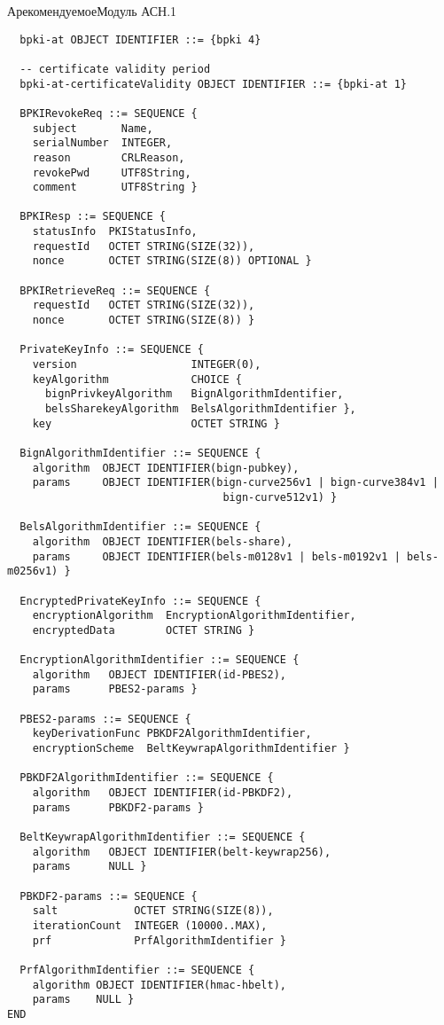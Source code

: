 \begin{appendix}{А}{рекомендуемое}{Модуль АСН.1}
\begin{verbatim}
  bpki-at OBJECT IDENTIFIER ::= {bpki 4}

  -- certificate validity period
  bpki-at-certificateValidity OBJECT IDENTIFIER ::= {bpki-at 1}

  BPKIRevokeReq ::= SEQUENCE {
    subject       Name,
    serialNumber  INTEGER,
    reason        CRLReason,
    revokePwd     UTF8String,
    comment       UTF8String }

  BPKIResp ::= SEQUENCE { 
    statusInfo  PKIStatusInfo,
    requestId   OCTET STRING(SIZE(32)),
    nonce       OCTET STRING(SIZE(8)) OPTIONAL }

  BPKIRetrieveReq ::= SEQUENCE {
    requestId   OCTET STRING(SIZE(32)),
    nonce       OCTET STRING(SIZE(8)) }

  PrivateKeyInfo ::= SEQUENCE {
    version                  INTEGER(0),
    keyAlgorithm             CHOICE {
      bignPrivkeyAlgorithm   BignAlgorithmIdentifier,
      belsSharekeyAlgorithm  BelsAlgorithmIdentifier },
    key                      OCTET STRING }
  
  BignAlgorithmIdentifier ::= SEQUENCE {
    algorithm  OBJECT IDENTIFIER(bign-pubkey),
    params     OBJECT IDENTIFIER(bign-curve256v1 | bign-curve384v1 | 
                                  bign-curve512v1) }
  
  BelsAlgorithmIdentifier ::= SEQUENCE {
    algorithm  OBJECT IDENTIFIER(bels-share),
    params     OBJECT IDENTIFIER(bels-m0128v1 | bels-m0192v1 | bels-m0256v1) }

  EncryptedPrivateKeyInfo ::= SEQUENCE {
    encryptionAlgorithm  EncryptionAlgorithmIdentifier,
    encryptedData        OCTET STRING }
  
  EncryptionAlgorithmIdentifier ::= SEQUENCE {
    algorithm   OBJECT IDENTIFIER(id-PBES2),
    params      PBES2-params }
  
  PBES2-params ::= SEQUENCE {
    keyDerivationFunc PBKDF2AlgorithmIdentifier,
    encryptionScheme  BeltKeywrapAlgorithmIdentifier }
  
  PBKDF2AlgorithmIdentifier ::= SEQUENCE {
    algorithm   OBJECT IDENTIFIER(id-PBKDF2),
    params      PBKDF2-params }
  
  BeltKeywrapAlgorithmIdentifier ::= SEQUENCE {
    algorithm   OBJECT IDENTIFIER(belt-keywrap256),
    params      NULL }

  PBKDF2-params ::= SEQUENCE {
    salt            OCTET STRING(SIZE(8)),
    iterationCount  INTEGER (10000..MAX),
    prf             PrfAlgorithmIdentifier }
  
  PrfAlgorithmIdentifier ::= SEQUENCE {
    algorithm OBJECT IDENTIFIER(hmac-hbelt), 
    params    NULL }
END
\end{verbatim}

\end{appendix}
  